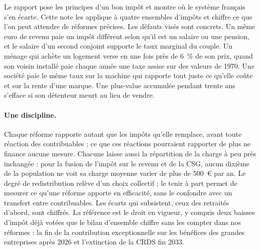 \documentclass[11pt,a4paper]{article}
\begin{document}
Le rapport pose les principes d'un bon impôt et montre où le système français s'en écarte. Cette note les applique à
quatre ensembles d'impôts et chiffre ce que l'on peut attendre de réformes précises. Les défauts visés sont concrets.
Un même euro de revenu paie un impôt différent selon qu'il est un salaire ou une pension, et le salaire d'un second
conjoint supporte le taux marginal du couple. Un ménage qui achète un logement verse en une fois près de 6~\% de son
prix, quand son voisin installé paie chaque année une taxe assise sur des valeurs de 1970. Une société paie le même taux
sur la machine qui rapporte tout juste ce qu'elle coûte et sur la rente d'une marque. Une plus-value accumulée pendant
trente ans s'efface si son détenteur meurt au lieu de vendre.

\paragraph{Une discipline.} Chaque réforme rapporte autant que les impôts qu'elle remplace, avant toute réaction des
contribuables ; ce que ces réactions pourraient rapporter de plus ne finance aucune mesure. Chacune laisse aussi la
répartition de la charge à peu près inchangée : pour la fusion de l'impôt sur le revenu et de la CSG, aucun dixième de
la population ne voit sa charge moyenne varier de plus de 500~€ par an. Le degré de redistribution relève d'un choix
collectif ; le tenir à part permet de mesurer ce qu'une réforme apporte en efficacité, sans le confondre avec un
transfert entre contribuables. Les écarts qui subsistent, ceux des retraités d'abord, sont chiffrés. La référence est le
droit en vigueur, y compris deux baisses d'impôt déjà votées que le bilan d'ensemble chiffre sans les compter dans nos
réformes : la fin de la contribution exceptionnelle sur les bénéfices des grandes entreprises après 2026 et
l'extinction de la CRDS fin 2033.
\end{document}
